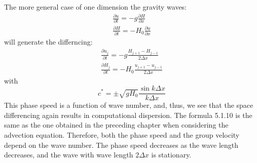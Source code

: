 The more general case of one dimension the gravity waves:
\begin{align*}
	\frac{\partial u}{\partial t}=-g\frac{\partial H}{\partial x} \\
	\frac{\partial H}{\partial t}=-H_0\frac{\partial u}{\partial x}
\end{align*}
will generate the differncing:
\begin{align}\label{5.1.6}
	\frac{\partial u_j}{\partial t}=-g\frac{H_{j+1}-H_{j-1}}{2\Delta x} \\
	\frac{\partial H_j}{\partial t}=-H_0\frac{u_{j+1}-u_{j-1}}{2\Delta x}
\end{align}
with \begin{equation}\label{5.1.10}
	c^*=\pm\sqrt{gH_0}\frac{\sin k\Delta x}{k\Delta x}
\end{equation}
This phase speed is a function of wave number, and, thus, we see that the space differencing again results in computational dispersion. The formula 5.1.10 is the same as the one obtained in the preceding chapter when considering the advection equation. Therefore, both the phase speed and the group velocity depend on the wave number. The phase speed decreases as the wave length decreases, and the wave with wave length
$2\Delta x$ is stationary.

